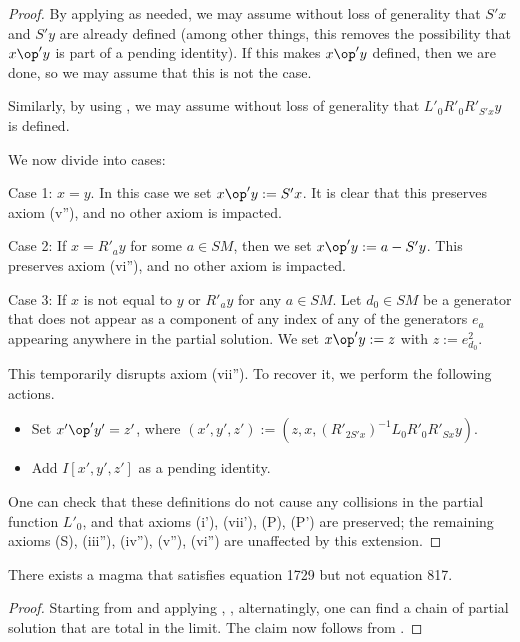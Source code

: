 \begin{proof}\leanok  By applying  as needed, we may assume without loss of generality that $S'x$ and $S'y$ are already defined (among other things, this removes the possibility that $x \op' y$ is part of a pending identity).  If this makes $x \op' y$ defined, then we are done, so we may assume that this is not the case.

  Similarly, by using , we may assume without loss of generality that  $L'_0 R'_0 R'_{S'x} y$ is defined.

We now divide into cases:

Case 1: $x=y$.  In this case we set $x \op' y := S'x$.  It is clear that this preserves axiom (v''), and no other axiom is impacted.

Case 2: If $x = R'_a y$ for some $a \in SM$, then we set $x \op' y := a - S'y$.  This preserves axiom (vi''), and no other axiom is impacted.

Case 3: If $x$ is not equal to $y$ or $R'_a y$ for any $a \in SM$.  Let $d_0 \in SM$ be a generator that does not appear as a component of any index of any of the generators $e_a$ appearing anywhere in the partial solution.  We set $x \op' y := z$ with $z := e^2_{d_0}$.

This temporarily disrupts axiom (vii'').  To recover it, we perform the following actions.
\begin{itemize}
  \item Set $x' \op' y' = z'$, where $(x',y',z') := (z, x, (R'_{2S'x})^{-1} L_0 R'_0 R'_{Sx} y)$.
  \item Add $I[x',y',z']$ as a pending identity.
\end{itemize}

One can check that these definitions do not cause any collisions in the partial function $L'_0$, and that axioms (i'), (vii'), (P), (P') are preserved; the remaining axioms (S), (iii''), (iv''), (v''), (vi'') are unaffected by this extension.
\end{proof}


\begin{theorem}\label{1729_refute_817}\leanok There exists a magma that satisfies equation 1729 but not equation 817.
\end{theorem}

\begin{proof}\leanok
  Starting from  and applying , ,  alternatingly, one can find a chain of partial solution that are total in the limit.  The claim now follows from .
\end{proof}


